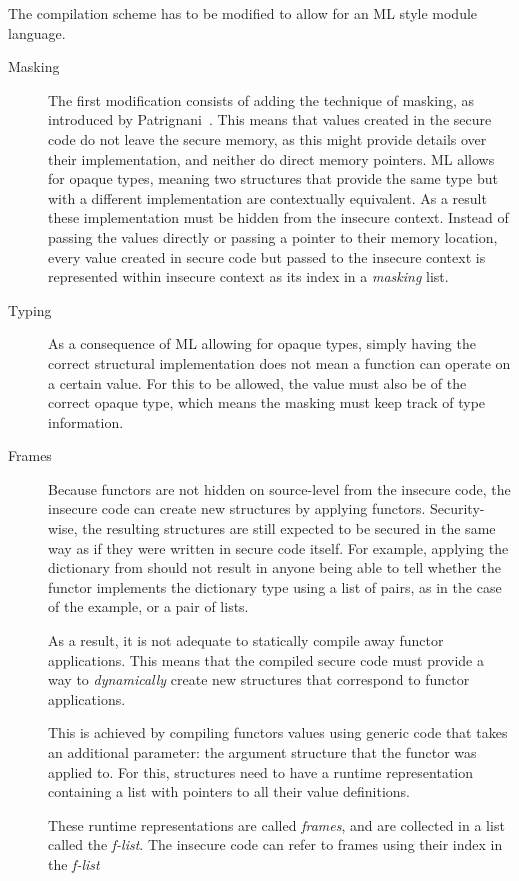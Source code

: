 \documentclass[11pt]{article}
\begin{document}
The compilation scheme has to be modified to allow for an ML style module language.
\begin{description}
\item[Masking] The first modification consists of adding the technique of masking, as introduced by Patrignani~\cite{Patrignani}.
This means that values created in the secure code do not leave the secure memory, as this might provide details over their implementation, and neither do direct memory pointers.
ML allows for opaque types, meaning two structures that provide the same type but with a different implementation are contextually equivalent. 
As a result these implementation must be hidden from the insecure context.
Instead of passing the values directly or passing a pointer to their memory location, every value created in secure code but passed to the insecure context is represented within insecure context as its index in a \emph{masking} list.

\item[Typing]
As a consequence of ML allowing for opaque types, simply having the correct structural implementation does not mean a function can operate on a certain value.
For this to be allowed, the value must also be of the correct opaque type, which means the masking must keep track of type information.

\item[Frames]
Because functors are not hidden on source-level from the insecure code, the insecure code can create new structures by applying functors.
Security-wise, the resulting structures are still expected to be secured in the same way as if they were written in secure code itself.
For example, applying the dictionary from  should not result in anyone being able to tell whether the functor implements the dictionary type using a list of pairs, as in the case of the example, or a pair of lists.

As a result, it is not adequate to statically compile away functor applications.
This means that the compiled secure code must provide a way to \emph{dynamically} create new structures that correspond to functor applications.

This is achieved by compiling functors values using generic code that takes an additional parameter: the argument structure that the functor was applied to.
For this, structures need to have a runtime representation containing a list with pointers to all their value definitions.

These runtime representations are called \emph{frames}, and are collected in a list called the \emph{f-list}.
The insecure code can refer to frames using their index in the \emph{f-list}


\end{description}
\end{document}
